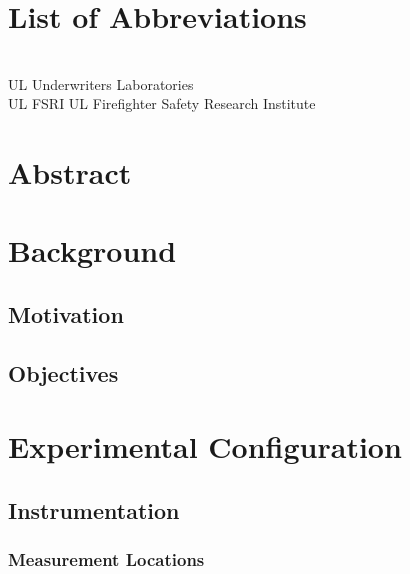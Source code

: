 \documentclass[12pt,oneside]{book}
\begin{document}
\cleardoublepage
{}
{}
\listoffigures

\cleardoublepage
{}
{}
\listoftables

\chapter{List of Abbreviations}

\begin{tabbing}
\hspace{1.5in} \= \\
UL 	    \> Underwriters Laboratories \\
UL FSRI \> UL Firefighter Safety Research Institute \\
\end{tabbing}

\newpage

\mainmatter

\chapter*{\centering Abstract}

\newpage

\chapter{Background}

\section{Motivation}

\section{Objectives}


\chapter{Experimental Configuration}
\label{chap:exp_config}

\section{Instrumentation}
\label{sec:instrument}

\subsection{Measurement Locations}
\label{subsec:measure_locs}
\end{document}
